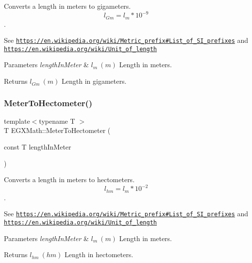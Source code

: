 Converts a length in meters to gigameters. \[ l_{Gm}=l_{m} * 10^{-9} \]. 

See \href{https://en.wikipedia.org/wiki/Metric_prefix#List_of_SI_prefixes}{\tt https\+://en.\+wikipedia.\+org/wiki/\+Metric\+\_\+prefix\#\+List\+\_\+of\+\_\+\+S\+I\+\_\+prefixes} and \href{https://en.wikipedia.org/wiki/Unit_of_length}{\tt https\+://en.\+wikipedia.\+org/wiki/\+Unit\+\_\+of\+\_\+length} 
\begin{DoxyParams}{Parameters}
{\em length\+In\+Meter} & $ l_{m}\ (m)$ Length in meters. \\
\hline
\end{DoxyParams}
\begin{DoxyReturn}{Returns}
$ l_{Gm}\ (m)$ Length in gigameters. 
\end{DoxyReturn}
\mbox{\label{group___e_g_x_math-_conversions-_length_conversions-_s_i-_meter-_s_i_ga1de9cc8f2ecedbf82eacc869b0c0569c}} 
\subsubsection{\texorpdfstring{Meter\+To\+Hectometer()}{MeterToHectometer()}}
{\footnotesize\ttfamily template$<$typename T $>$ \\
T E\+G\+X\+Math\+::\+Meter\+To\+Hectometer (\begin{DoxyParamCaption}\item[{const T}]{length\+In\+Meter }\end{DoxyParamCaption})}



Converts a length in meters to hectometers. \[ l_{hm}=l_{m} * 10^{-2} \]. 

See \href{https://en.wikipedia.org/wiki/Metric_prefix#List_of_SI_prefixes}{\tt https\+://en.\+wikipedia.\+org/wiki/\+Metric\+\_\+prefix\#\+List\+\_\+of\+\_\+\+S\+I\+\_\+prefixes} and \href{https://en.wikipedia.org/wiki/Unit_of_length}{\tt https\+://en.\+wikipedia.\+org/wiki/\+Unit\+\_\+of\+\_\+length} 
\begin{DoxyParams}{Parameters}
{\em length\+In\+Meter} & $ l_{m}\ (m)$ Length in meters. \\
\hline
\end{DoxyParams}
\begin{DoxyReturn}{Returns}
$ l_{hm}\ (hm)$ Length in hectometers. 
\end{DoxyReturn}
\mbox{\label{group___e_g_x_math-_conversions-_length_conversions-_s_i-_meter-_s_i_ga31b34ce8172d5b2401deb27db4ed6ece}} 
